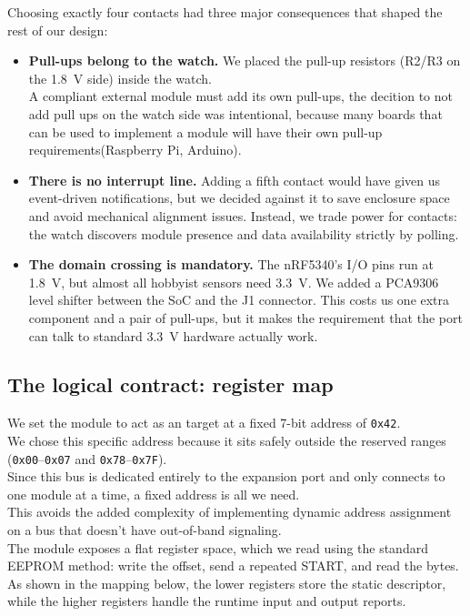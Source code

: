 \documentclass[12pt, a4paper]{article}
\begin{document}
Choosing exactly four contacts had three major consequences that shaped the rest of our design:

\begin{itemize}
  \item \textbf{Pull-ups belong to the watch.} We placed the  pull-up resistors (R2/R3 on the \SI{1.8}{\volt} side) inside the watch.\\
  A compliant external module must add its own pull-ups, the decition to not add pull ups on the watch side was intentional, because many boards that can be used to implement a module will have their own pull-up requirements(Raspberry Pi, Arduino).

  \item \textbf{There is no interrupt line.} Adding a fifth contact would have given us event-driven notifications, but we decided against it to save enclosure space and avoid mechanical alignment issues. Instead, we trade power for contacts: the watch discovers module presence and data availability strictly by polling.

  \item \textbf{The domain crossing is mandatory.} The nRF5340's I/O pins run at \SI{1.8}{\volt}, but almost all hobbyist sensors need \SI{3.3}{\volt}. We added a PCA9306 level shifter between the SoC and the J1 connector. This costs us one extra component and a pair of pull-ups, but it makes the requirement that the port can talk to standard \SI{3.3}{\volt}  hardware actually work.
\end{itemize}

\subsection{The logical contract: register map}

We set the module to act as an  target at a fixed 7-bit address of \texttt{0x42}.\\
We chose this specific address because it sits safely outside the reserved  ranges (\texttt{0x00}--\texttt{0x07} and \texttt{0x78}--\texttt{0x7F}). \\
Since this  bus is dedicated entirely to the expansion port and only connects to one module at a time, a fixed address is all we need. \\
This avoids the added complexity of implementing dynamic address assignment on a bus that doesn't have out-of-band signaling. \\
The module exposes a flat register space, which we read using the standard EEPROM method: write the offset, send a repeated START, and read the bytes. \\
As shown in the mapping below, the lower registers store the static descriptor, while the higher registers handle the runtime input and output reports.
\end{document}
